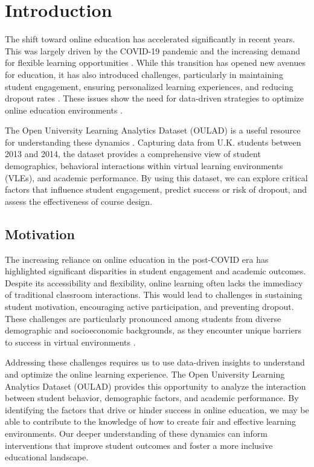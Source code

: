\section*{Introduction}

The shift toward online education has accelerated significantly in recent years. This was largely driven by the COVID-19 pandemic and the increasing demand for flexible learning opportunities \cite{Dhawan2020, OECD2020}. While this transition has opened new avenues for education, it has also introduced challenges, particularly in maintaining student engagement, ensuring personalized learning experiences, and reducing dropout rates \cite{Kuh2007, Tinto2012}. These issues show the need for data-driven strategies to optimize online education environments \cite{Siemens2013}.

The Open University Learning Analytics Dataset (OULAD) is a useful resource for understanding these dynamics \cite{Kuzilek2017}. Capturing data from U.K. students between 2013 and 2014, the dataset provides a comprehensive view of student demographics, behavioral interactions within virtual learning environments (VLEs), and academic performance. By using this dataset, we can explore critical factors that influence student engagement, predict success or risk of dropout, and assess the effectiveness of course design.

\subsection*{Motivation}

The increasing reliance on online education in the post-COVID era has highlighted significant disparities in student engagement and academic outcomes. Despite its accessibility and flexibility, online learning often lacks the immediacy of traditional classroom interactions. This would lead to challenges in sustaining student motivation, encouraging active participation, and preventing dropout. These challenges are particularly pronounced among students from diverse demographic and socioeconomic backgrounds, as they encounter unique barriers to success in virtual environments \cite{Kuzilek2017}.

Addressing these challenges requires us to use data-driven insights to understand and optimize the online learning experience. The Open University Learning Analytics Dataset (OULAD) provides this opportunity to analyze the interaction between student behavior, demographic factors, and academic performance. By identifying the factors that drive or hinder success in online education, we may be able to contribute to the knowledge of how to create fair and effective learning environments.  Our deeper understanding of these dynamics can inform interventions that improve student outcomes and foster a more inclusive educational landscape.

